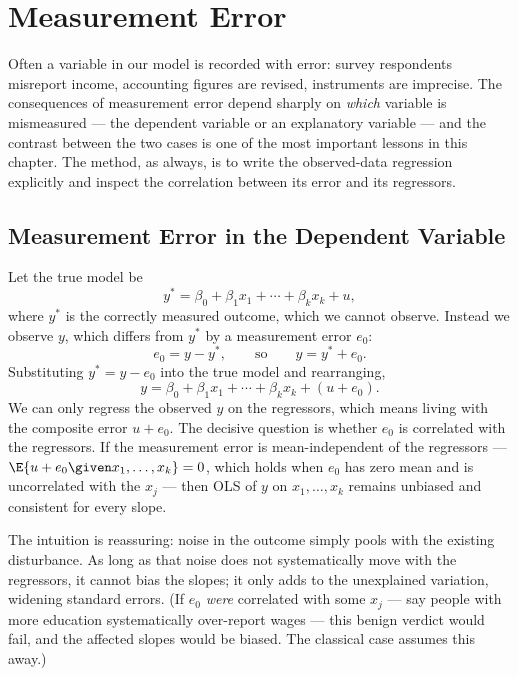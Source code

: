 \section{Measurement Error}

Often a variable in our model is recorded with error: survey respondents misreport income, accounting figures are revised, instruments are imprecise. The consequences of measurement error depend sharply on \emph{which} variable is mismeasured --- the dependent variable or an explanatory variable --- and the contrast between the two cases is one of the most important lessons in this chapter. The method, as always, is to write the observed-data regression explicitly and inspect the correlation between its error and its regressors.

\subsection{Measurement Error in the Dependent Variable}

Let the true model be
\[
y^* = \beta_0 + \beta_1 x_1 + \cdots + \beta_k x_k + u,
\]
where $y^*$ is the correctly measured outcome, which we cannot observe. Instead we observe $y$, which differs from $y^*$ by a measurement error $e_0$:
\[
e_0 = y - y^*, \qquad \text{so} \qquad y = y^* + e_0.
\]
Substituting $y^* = y - e_0$ into the true model and rearranging,
\[
y = \beta_0 + \beta_1 x_1 + \cdots + \beta_k x_k + (u + e_0).
\]
We can only regress the observed $y$ on the regressors, which means living with the composite error $u + e_0$. The decisive question is whether $e_0$ is correlated with the regressors. If the measurement error is mean-independent of the regressors --- $\E{u + e_0 \given x_1,\dots,x_k}=0$, which holds when $e_0$ has zero mean and is uncorrelated with the $x_j$ --- then OLS of $y$ on $x_1,\dots,x_k$ remains unbiased and consistent for every slope.


The intuition is reassuring: noise in the outcome simply pools with the existing disturbance. As long as that noise does not systematically move with the regressors, it cannot bias the slopes; it only adds to the unexplained variation, widening standard errors. (If $e_0$ \emph{were} correlated with some $x_j$ --- say people with more education systematically over-report wages --- this benign verdict would fail, and the affected slopes would be biased. The classical case assumes this away.)

